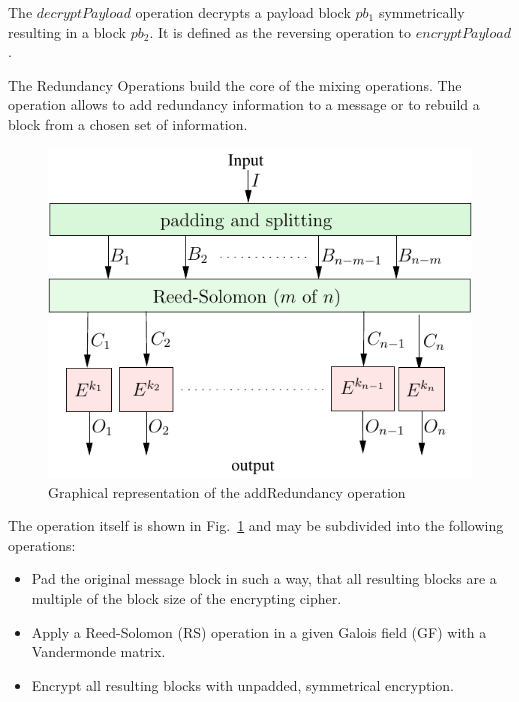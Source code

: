 \documentclass[acmsmall, screen]{acmart}
\begin{document}
The $decryptPayload$ operation decrypts a payload block $pb_1$ symmetrically resulting in a block $pb_2$. It is defined as the reversing operation to $encryptPayload$. 

%
%

The Redundancy Operations build the core of the mixing operations. The operation allows to add redundancy information to a message or to rebuild a block from a chosen set of information. 

\begin{figure}[ht]\centering
	\includegraphics[width=0.5\columnwidth]{addRedundancyOp}
	\caption{Graphical representation of the addRedundancy operation}
	\label{fig:addRedundancyOperation}
\end{figure}

The operation itself is shown in Fig.~\ref{fig:addRedundancyOperation} and may be subdivided into the following operations:
\begin{itemize}
	\item Pad the original message block in such a way, that all resulting blocks are a multiple of the block size of the encrypting cipher.
	\item Apply a Reed-Solomon (RS) operation in a given Galois field (GF) with a Vandermonde matrix.
	\item Encrypt all resulting blocks with unpadded, symmetrical encryption.
\end{itemize}
\end{document}
